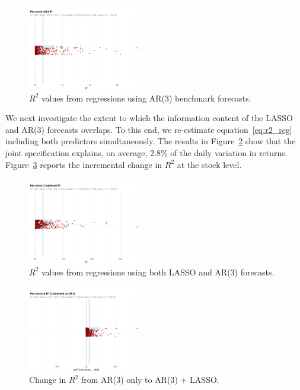 \documentclass[10pt,twocolumn]{article}
\begin{document}
\begin{figure}[h!]  
    \centering
    \includegraphics[width=0.45\textwidth]{ar3_r2_plot.png} 
    \caption{\(R^2\) values from regressions using AR(3) benchmark forecasts.}
    \label{fig:r2_oos_benchmark}  
\end{figure}

We next investigate the extent to which the information content of the LASSO and AR(3) forecasts overlaps. To this end, we re-estimate equation~\eqref{eq:r2_reg} including both predictors simultaneously. The results in Figure~\ref{fig:r2_oos_benchmar_lasso} show that the joint specification explains, on average, 2.8\% of the daily variation in returns. Figure~\ref{fig:r2_oos_benchmar_lasso_delta} reports the incremental change in \(R^2\) at the stock level.  

\begin{figure}[h!] %
    \centering
    \includegraphics[width=0.45\textwidth]{combined_r2_plot.png} 
    \caption{\(R^2\) values from regressions using both LASSO and AR(3) forecasts.}
    \label{fig:r2_oos_benchmar_lasso} %
\end{figure}

\begin{figure}[h!] %
    \centering
    \includegraphics[width=0.45\textwidth]{delta_combined_ar3_r2_plot.png} 
    \caption{Change in $R^2$ from AR(3) only to AR(3) + LASSO.}
    \label{fig:r2_oos_benchmar_lasso_delta} %
\end{figure}
\end{document}
